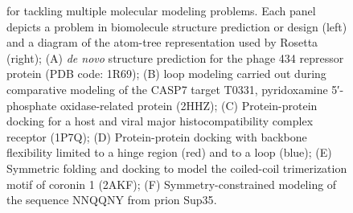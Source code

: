 \begin{refsection}
\begin{figure}[h!]
{            for tackling multiple molecular modeling problems. Each panel
            depicts a problem in biomolecule structure prediction or design
            (left) and a diagram of the atom-tree representation used by
            Rosetta (right); (A) \emph{de novo} structure prediction for the
            phage 434 repressor protein (PDB code: 1R69); (B) loop modeling
            carried out during comparative modeling of the CASP7 target T0331,
            pyridoxamine 5′-phosphate oxidase-related protein (2HHZ); (C)
            Protein-protein docking for a host and viral major
            histocompatibility complex receptor (1P7Q); (D) Protein-protein
            docking with backbone flexibility limited to a hinge region (red)
            and to a loop (blue); (E) Symmetric folding and docking to model
            the coiled-coil trimerization motif of coronin 1 (2AKF); (F)
            Symmetry-constrained modeling of the sequence NNQQNY from prion
            Sup35\cite{Das2008}.} 
        \label{fig:rosetta-overview} 
\end{figure}


\end{refsection}
